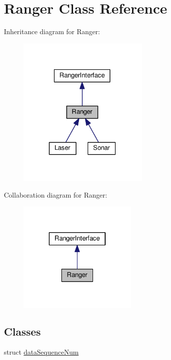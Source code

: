 \hypertarget{classRanger}{}\section{Ranger Class Reference}
\label{classRanger}


Inheritance diagram for Ranger\+:
\nopagebreak
\begin{figure}[H]
\begin{center}
\leavevmode
\includegraphics[width=182pt]{classRanger__inherit__graph}
\end{center}
\end{figure}


Collaboration diagram for Ranger\+:
\nopagebreak
\begin{figure}[H]
\begin{center}
\leavevmode
\includegraphics[width=166pt]{classRanger__coll__graph}
\end{center}
\end{figure}
\subsection*{Classes}
\begin{DoxyCompactItemize}
\item 
struct \hyperlink{structRanger_1_1dataSequenceNum}{data\+Sequence\+Num}
\end{DoxyCompactItemize}

